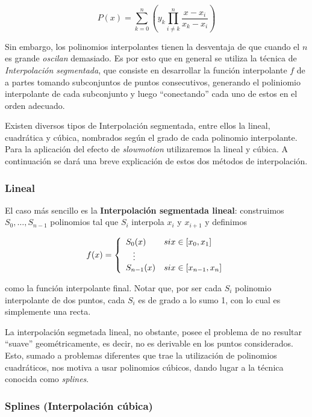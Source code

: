 \[P(x) = \sum_{k = 0}^n \left(y_k \prod_{i \neq k}^n \frac{x - x_i}{x_k - x_i}\right)\]

Sin embargo, los polinomios interpolantes tienen la desventaja de que cuando el $n$ es grande \emph{oscilan} demasiado. Es por esto que en general se utiliza la técnica de \emph{Interpolación segmentada}, que consiste en desarrollar la función interpolante $f$ de a partes tomando subconjuntos de puntos consecutivos, generando el poliniomio interpolante de cada subconjunto y luego ``conectando'' cada uno de estos en el orden adecuado.

Existen diversos tipos de Interpolaci\'on segmentada, entre ellos la lineal, cuadr\'atica y c\'ubica, nombrados según el grado de cada polinomio interpolante. Para la aplicaci\'on del efecto de \emph{slowmotion} utilizaremos la lineal y c\'ubica. A continuaci\'on se dar\'a una breve explicaci\'on de estos dos m\'etodos de interpolaci\'on. 

\subsubsection{Lineal}

El caso m\'as sencillo es la \textbf{Interpolación segmentada lineal}: construimos $S_0, \ldots, S_{n - 1}$ polinomios tal que $S_i$ interpola $x_i$ y $x_{i + 1}$ y definimos

\[
f(x) = 
\left\{
    \begin{array}{ll}
        S_0(x)  & \mbox{si } x \in [x_{0}, x_1] \\
        \hspace{0.3cm}\vdots \\     
        S_{n - 1}(x) & \mbox{si } x \in [x_{n - 1}, x_n]
    \end{array}
\right.
\]

como la función interpolante final. Notar que, por ser cada $S_i$ polinomio interpolante de dos puntos, cada $S_i$ es de grado a lo sumo 1, con lo cual es simplemente una recta.

La interpolación segmetada lineal, no obstante, posee el problema de no resultar ``suave'' geométricamente, es decir, no es derivable en los puntos considerados. Esto, sumado a problemas diferentes que trae la utilización de polinomios cuadráticos, nos motiva a usar polinomios cúbicos, dando lugar a la técnica conocida como \emph{splines}.

\subsubsection{Splines (Interpolaci\'on c\'ubica)}\label{sec:splines}

